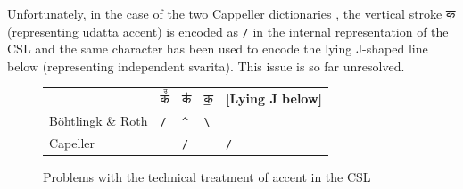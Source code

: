 Unfortunately, in the case of the two Cappeller dictionaries \citep{ccs,cae}, the vertical stroke {\devfont क॑} (representing udātta accent) is encoded as \texttt{{/}} in the internal representation of the CSL and the same character has been used to encode the lying J-shaped line below (representing independent svarita). This issue is so far unresolved.

\begin{figure}[!ht]
\begin{center}
\begingroup
\setlength{\tabcolsep}{10pt} %
\renewcommand{\arraystretch}{1.5} %
\begin{tabular}{lllll}
 & {\devbfont क꣫} & {\devbfont क॑} & {\devbfont क॒} & {\bf [Lying J below]}\\
Böhtlingk \& Roth&\texttt{{/}}&\texttt{{\textasciicircum}}&\texttt{{\textbackslash}} &\\
Capeller&&\texttt{{/}}&&\texttt{{/}}
\end{tabular}
\endgroup
\end{center}
\caption[Problems with the technical treatment of accent in the CSL]{\label{tab:csl2}Problems with the technical treatment of accent in the CSL}
\end{figure}






